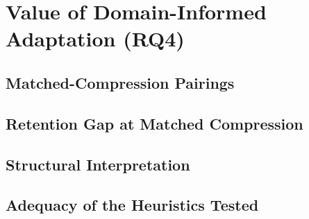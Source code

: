 \section{Value of Domain-Informed Adaptation (RQ4)}
\label{sec:results:rq4}

\subsection{Matched-Compression Pairings}
\label{sec:results:rq4:pairings}

\subsection{Retention Gap at Matched Compression}
\label{sec:results:rq4:gap}

\subsection{Structural Interpretation}
\label{sec:results:rq4:interpretation}

\subsection{Adequacy of the Heuristics Tested}
\label{sec:results:rq4:adequacy}


